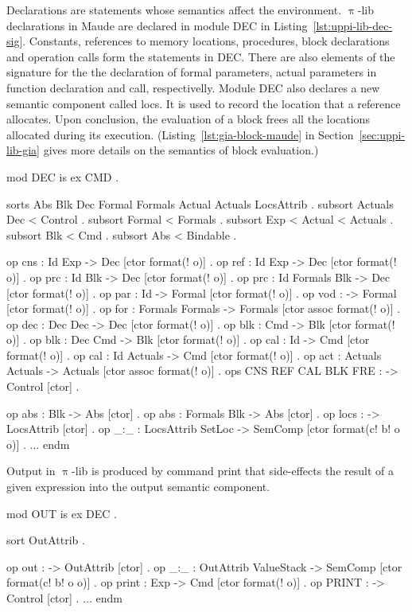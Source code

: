 \documentclass{llncs}%
\begin{document}
Declarations are statements whose semantics affect the environment. $\uppi$-lib declarations in Maude are declared in module DEC in Listing~\ref{lst:uppi-lib-dec-sig}. Constants, references to memory locations, procedures, block declarations and operation calls form the statements in DEC. There are also elements of the signature for the the declaration of formal parameters, actual parameters in function declaration and call, respectivelly. Module DEC also declares a new semantic component called locs. It is used to record the location that a reference allocates. Upon conclusion, the evaluation of a block frees all the locations allocated during its execution.  (Listing~\ref{lst:gia-block-maude} in Section~\ref{sec:uppi-lib-gia} gives more details on the semantics of block evaluation.)
\begin{maude}[caption=Signature for $\uppi$-lib declarations in Maude, label=lst:uppi-lib-dec-sig]
mod DEC is
    ex CMD .

    sorts Abs Blk Dec Formal Formals Actual Actuals LocsAttrib .
    subsort Actuals Dec < Control .
    subsort Formal < Formals .
    subsort Exp < Actual < Actuals .
    subsort Blk < Cmd .
    subsort Abs < Bindable .

    op cns : Id Exp -> Dec [ctor format(! o)] .
    op ref : Id Exp -> Dec [ctor format(! o)] .
    op prc : Id Blk -> Dec [ctor format(! o)] .
    op prc : Id Formals Blk -> Dec [ctor format(! o)] .
    op par : Id -> Formal [ctor format(! o)] .
    op vod : -> Formal [ctor format(! o)] .
    op for : Formals Formals -> Formals [ctor assoc format(! o)] .
    op dec : Dec Dec -> Dec [ctor format(! o)] .
    op blk : Cmd -> Blk [ctor format(! o)] .
    op blk : Dec Cmd -> Blk [ctor format(! o)] .
    op cal : Id -> Cmd [ctor format(! o)] .
    op cal : Id Actuals -> Cmd [ctor format(! o)] .
    op act : Actuals Actuals -> Actuals [ctor assoc format(! o)] .
    ops CNS REF CAL BLK FRE : -> Control [ctor] .
    
    op abs : Blk -> Abs [ctor] .
    op abs : Formals Blk -> Abs [ctor] .
    op locs : -> LocsAttrib [ctor] .
    op _:_ : LocsAttrib Set{Loc} -> SemComp [ctor format(c! b! o o)] .
    $\ldots$
endm
\end{maude}

Output in $\uppi$-lib is produced by command print that side-effects the result of a given expression into the output semantic component.
\begin{maude}[caption={Signature for $\uppi$-lib output in Maude}, label=lst:uppi-lib-output-sig]
mod OUT is
    ex DEC .

    sort OutAttrib .

    op out : -> OutAttrib [ctor] .
    op _:_ : OutAttrib ValueStack -> SemComp [ctor format(c! b! o o)] .
    op print : Exp -> Cmd [ctor format(! o)] .
    op PRINT : -> Control [ctor] .
    $\ldots$
endm
\end{maude}
\end{document}
